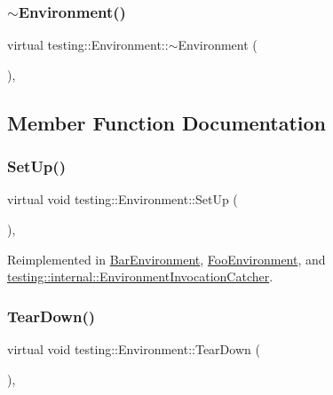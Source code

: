 \subsubsection{\texorpdfstring{$\sim$\+Environment()}{~Environment()}}
{\footnotesize\ttfamily virtual testing\+::\+Environment\+::$\sim$\+Environment (\begin{DoxyParamCaption}{ }\end{DoxyParamCaption})\hspace{0.3cm}{\ttfamily [inline]}, {\ttfamily [virtual]}}



\subsection{Member Function Documentation}
\mbox{\label{classtesting_1_1_environment_a1bf8cafaa9d4eba9feb98655ee434eb3}} 
\subsubsection{\texorpdfstring{Set\+Up()}{SetUp()}}
{\footnotesize\ttfamily virtual void testing\+::\+Environment\+::\+Set\+Up (\begin{DoxyParamCaption}{ }\end{DoxyParamCaption})\hspace{0.3cm}{\ttfamily [inline]}, {\ttfamily [virtual]}}



Reimplemented in \hyperlink{class_bar_environment_a88e17c5dd1dcea7a4538f2f3c6bf7bdd}{Bar\+Environment}, \hyperlink{class_foo_environment_a7db8d8b312805aff437ae8534132a56d}{Foo\+Environment}, and \hyperlink{classtesting_1_1internal_1_1_environment_invocation_catcher_a325365b0ecfa71a4a767d7a1817c9663}{testing\+::internal\+::\+Environment\+Invocation\+Catcher}.

\mbox{\label{classtesting_1_1_environment_a039bdaa705c46b9b88234cf4d3bb6254}} 
\subsubsection{\texorpdfstring{Tear\+Down()}{TearDown()}}
{\footnotesize\ttfamily virtual void testing\+::\+Environment\+::\+Tear\+Down (\begin{DoxyParamCaption}{ }\end{DoxyParamCaption})\hspace{0.3cm}{\ttfamily [inline]}, {\ttfamily [virtual]}}



